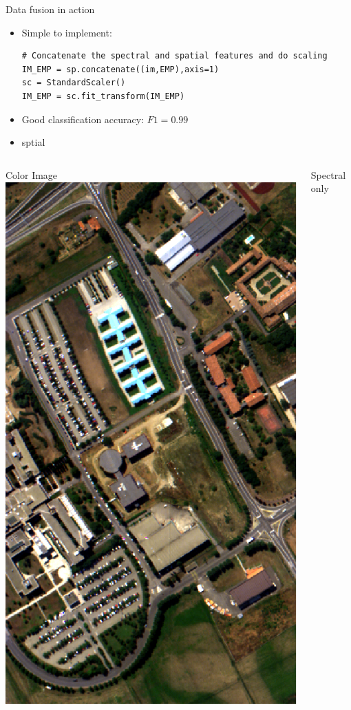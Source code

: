 \documentclass[10pt,aspectratio=1610]{beamer}
\begin{document}
\begin{frame}[fragile,label={sec:org11b2e48}]{Data fusion in action}
 \begin{itemize}
\item Simple to implement:
\begin{verbatim}
# Concatenate the spectral and spatial features and do scaling
IM_EMP = sp.concatenate((im,EMP),axis=1)
sc = StandardScaler()
IM_EMP = sc.fit_transform(IM_EMP)
\end{verbatim}
\item Good classification accuracy: \(F1=0.99\)
\item sptial
\end{itemize}

\begin{columns}
\begin{column}{0.3\columnwidth}
\begin{block}{Color Image}
\includegraphics[trim=2.cm 1cm 2cm 14.304cm, clip=true,width=\textwidth,height=0.8\textwidth]{./figures/university_color.png}
\end{block}
\end{column}
\begin{column}{0.3\columnwidth}
\begin{block}{Spectral only}

\end{block}
\end{column}
\end{columns}
\end{frame}
\end{document}
